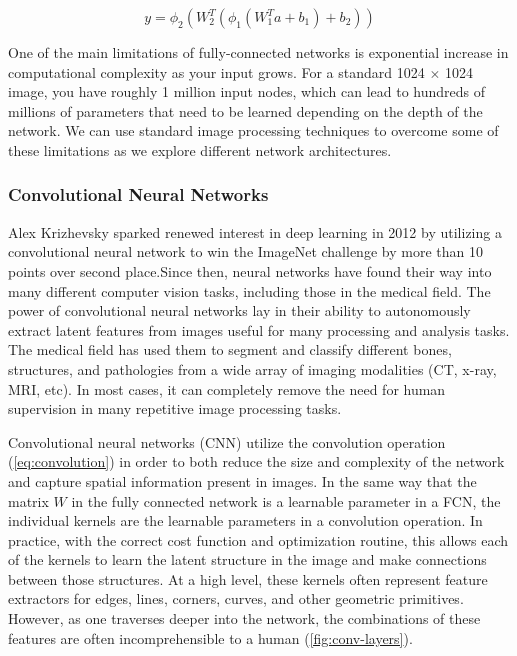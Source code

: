 \begin{equation}
    y = \phi_2 (W_2^{T}(\phi_1(W_1^{T}a + b_1) + b_2))
    \label{eq:2-layer-fcn}
\end{equation}

One of the main limitations of fully-connected networks is exponential increase in computational complexity as your input grows. For a standard 1024 $\times$ 1024 image, you have roughly 1 million input nodes, which can lead to hundreds of millions of parameters that need to be learned depending on the depth of the network. We can use standard image processing techniques to overcome some of these limitations as we explore different network architectures.

\subsubsection{Convolutional Neural Networks}

Alex Krizhevsky sparked renewed interest in deep learning in 2012 by utilizing a convolutional neural network to win the ImageNet challenge \cite{russakovskyImageNetLargeScale2015} by more than 10 points over second place.Since then, neural networks have found their way into many different computer vision tasks, including those in the medical field. The power of convolutional neural networks lay in their ability to autonomously extract latent features from images useful for many processing and analysis tasks. The medical field has used them to segment and classify different bones, structures, and pathologies from a wide array of imaging modalities (CT, x-ray, MRI, etc). In most cases, it can completely remove the need for human supervision in many repetitive image processing tasks.

Convolutional neural networks (CNN) utilize the convolution operation (\cref{eq:convolution}) in order to both reduce the size and complexity of the network and capture spatial information present in images. In the same way that the matrix $W$ in the fully connected network is a learnable parameter in a FCN, the individual kernels are the learnable parameters in a convolution operation. In practice, with the correct cost function and optimization routine, this allows each of the kernels to learn the latent structure in the image and make connections between those structures. At a high level, these kernels often represent feature extractors for edges, lines, corners, curves, and other geometric primitives. However, as one traverses deeper into the network, the combinations of these features are often incomprehensible to a human (\cref{fig:conv-layers}).

